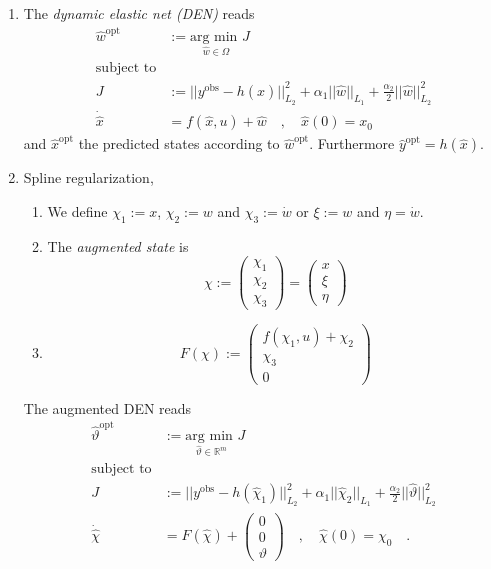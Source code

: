 \begin{enumerate}
\item The \textit{dynamic elastic net (DEN)} reads
	\begin{equation} \begin{aligned}
		\hat{w}^\text{opt} &:= \underset{\hat{w}\in \Omega}{\text{arg min } } J \\
		\text{subject to} \\
		J&:= ||y^\text{obs}-h(\hat{x})||_{L_2}^2 + \alpha_1 ||\hat{w}||_{L_1} 
		+ \frac{\alpha_2}{2}||\hat{w}||^2_{L_2} \\
		\dot{\hat{x}} &= f(\hat{x},u) + \hat{w} \quad , \quad \hat{x}(0) = x_0
	\end{aligned}\end{equation}
	and $\hat{x}^\text{opt}$ the predicted states according to $\hat{w}^\text{opt}$. 
	Furthermore $\hat{y}^\text{opt}=h(\hat{x})$.
	
\item Spline regularization,
	\begin{enumerate}
	\item We define $\chi_1 := x$, $\chi_2:=w$ and $\chi_3:=\dot{w}$ or
		$\xi:=w$ and $\eta=\dot{w}$.
	\item The \textit{augmented state} is
		\begin{equation}
			\chi := \begin{pmatrix}
			\chi_1 \\ \chi_2 \\ \chi_3 
			\end{pmatrix} = \begin{pmatrix}
			x \\ \xi \\ \eta 
			\end{pmatrix}  
		\end{equation}
	\item 
		\begin{equation}
			F(\chi) := \begin{pmatrix}
			f(\chi_1,u)+ \chi_2 \\ \chi_3 \\ 0
			\end{pmatrix}
		\end{equation}
	\end{enumerate}

	The augmented DEN reads
	\begin{equation} \begin{aligned}
		\hat{\vartheta}^\text{opt} &:= \underset{\hat{\vartheta}\in 
		\mathbb{R}^m}{\text{arg min } } J \\
		\text{subject to} \\
		J&:= ||y^\text{obs}-h(\hat{\chi}_1)||_{L_2}^2 + \alpha_1 ||\hat{\chi}_2||_{L_1} 
		+ \frac{\alpha_2}{2}||\hat{\vartheta}||^2_{L_2} \\
		\dot{\hat{\chi}} &= F(\hat{\chi}) + \begin{pmatrix}
		0 \\ 0 \\ \vartheta  
		\end{pmatrix}\quad , \quad  \hat{\chi}(0) = \chi_0 \quad .
	\end{aligned}\end{equation}


\end{enumerate}

